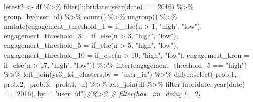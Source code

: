 \documentclass[
]{article}
\newenvironment{Shaded}{\begin{snugshade}}{\end{snugshade}}
\newcommand{\AttributeTok}[1]{\textcolor[rgb]{0.77,0.63,0.00}{#1}}
\newcommand{\CommentTok}[1]{\textcolor[rgb]{0.56,0.35,0.01}{\textit{#1}}}
\newcommand{\DecValTok}[1]{\textcolor[rgb]{0.00,0.00,0.81}{#1}}
\newcommand{\FloatTok}[1]{\textcolor[rgb]{0.00,0.00,0.81}{#1}}
\newcommand{\FunctionTok}[1]{\textcolor[rgb]{0.00,0.00,0.00}{#1}}
\newcommand{\NormalTok}[1]{#1}
\newcommand{\OtherTok}[1]{\textcolor[rgb]{0.56,0.35,0.01}{#1}}
\newcommand{\SpecialCharTok}[1]{\textcolor[rgb]{0.00,0.00,0.00}{#1}}
\newcommand{\StringTok}[1]{\textcolor[rgb]{0.31,0.60,0.02}{#1}}
\begin{document}
\begin{Shaded}
\begin{Highlighting}[]
\NormalTok{letest2 }\OtherTok{\textless{}{-}}\NormalTok{  df }\SpecialCharTok{\%\textgreater{}\%}
  \FunctionTok{filter}\NormalTok{(lubridate}\SpecialCharTok{::}\FunctionTok{year}\NormalTok{(date) }\SpecialCharTok{==} \DecValTok{2016}\NormalTok{) }\SpecialCharTok{\%\textgreater{}\%}
  \FunctionTok{group\_by}\NormalTok{(user\_id) }\SpecialCharTok{\%\textgreater{}\%}
  \FunctionTok{count}\NormalTok{() }\SpecialCharTok{\%\textgreater{}\%}
  \FunctionTok{ungroup}\NormalTok{() }\SpecialCharTok{\%\textgreater{}\%} 
  \FunctionTok{mutate}\NormalTok{(}\AttributeTok{engagement\_threshold\_1 =} \FunctionTok{if\_else}\NormalTok{(n }\SpecialCharTok{\textgreater{}} \DecValTok{1}\NormalTok{, }\StringTok{"high"}\NormalTok{, }\StringTok{"low"}\NormalTok{),}
         \AttributeTok{engagement\_threshold\_3 =} \FunctionTok{if\_else}\NormalTok{(n }\SpecialCharTok{\textgreater{}} \DecValTok{3}\NormalTok{, }\StringTok{"high"}\NormalTok{, }\StringTok{"low"}\NormalTok{),}
         \AttributeTok{engagement\_threshold\_5 =} \FunctionTok{if\_else}\NormalTok{(n }\SpecialCharTok{\textgreater{}} \DecValTok{5}\NormalTok{, }\StringTok{"high"}\NormalTok{, }\StringTok{"low"}\NormalTok{),}
         \AttributeTok{engagement\_threshold\_10 =} \FunctionTok{if\_else}\NormalTok{(n }\SpecialCharTok{\textgreater{}} \DecValTok{10}\NormalTok{, }\StringTok{"high"}\NormalTok{, }\StringTok{"low"}\NormalTok{),}
         \AttributeTok{engagement\_kron =} \FunctionTok{if\_else}\NormalTok{(n }\SpecialCharTok{\textgreater{}} \DecValTok{17}\NormalTok{, }\StringTok{"high"}\NormalTok{, }\StringTok{"low"}\NormalTok{)) }\SpecialCharTok{\%\textgreater{}\%} 
  \FunctionTok{filter}\NormalTok{(engagement\_threshold\_5 }\SpecialCharTok{==} \StringTok{"high"}\NormalTok{) }\SpecialCharTok{\%\textgreater{}\%} 
  \FunctionTok{left\_join}\NormalTok{(yr3\_k4\_clusters,}\AttributeTok{by =} \StringTok{"user\_id"}\NormalTok{) }\SpecialCharTok{\%\textgreater{}\%} 
\NormalTok{  dplyr}\SpecialCharTok{::}\FunctionTok{select}\NormalTok{(}\SpecialCharTok{{-}}\NormalTok{prob}\FloatTok{.1}\NormalTok{,}
          \SpecialCharTok{{-}}\NormalTok{prob}\FloatTok{.2}\NormalTok{,}
          \SpecialCharTok{{-}}\NormalTok{prob}\FloatTok{.3}\NormalTok{,}
          \SpecialCharTok{{-}}\NormalTok{prob}\FloatTok{.4}\NormalTok{,}
          \SpecialCharTok{{-}}\NormalTok{n) }\SpecialCharTok{\%\textgreater{}\%} 
  \FunctionTok{left\_join}\NormalTok{(df }\SpecialCharTok{\%\textgreater{}\%}
  \FunctionTok{filter}\NormalTok{(lubridate}\SpecialCharTok{::}\FunctionTok{year}\NormalTok{(date) }\SpecialCharTok{==} \DecValTok{2016}\NormalTok{),}
         \AttributeTok{by =} \StringTok{"user\_id"}\NormalTok{)}\CommentTok{\#\%\textgreater{}\%}
\CommentTok{\#  filter(how\_im\_doing != 0)}



\end{Highlighting}
\end{Shaded}
\end{document}
